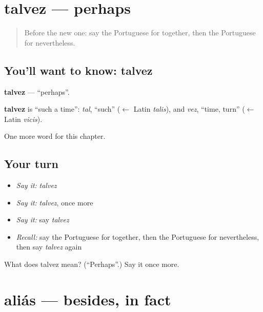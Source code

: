 \section[talvez]{talvez — perhaps}

\label{lesson:PT-C214-talvez}



\begin{quote}
Before the new one: say the Portuguese for together, then the Portuguese for nevertheless.
\end{quote}

\subsection*{You'll want to know: talvez}
\textbf{talvez} — \textquotedblleft{}perhaps\textquotedblright{}.

\begin{cousinweb}
\textbf{talvez} is \textquotedblleft{}such a time\textquotedblright{}: \emph{tal}, \textquotedblleft{}such\textquotedblright{} ($\leftarrow$ Latin \emph{talis}), and \emph{vez}, \textquotedblleft{}time, turn\textquotedblright{} ($\leftarrow$ Latin \emph{vicis}).
\end{cousinweb}

\begin{grammarlens}[title={What you've built}]
One more word for this chapter.
\end{grammarlens}

\subsection*{Your turn}
\begin{itemize}
\raggedright
  \item \emph{Say it:} \emph{talvez}
  \item \emph{Say it:} \emph{talvez}, once more
  \item \emph{Say it:} say \emph{talvez}
  \item \emph{Recall:} say the Portuguese for together, then the Portuguese for nevertheless, then say \emph{talvez} again
\end{itemize}

\begin{tcolorbox}[breakable,colback=teal!4,colframe=teal!35!black,title={Before you move on}]
What does talvez mean? (\textquotedblleft{}Perhaps\textquotedblright{}.) Say it once more.
\end{tcolorbox}
\section[aliás]{aliás — besides, in fact}


